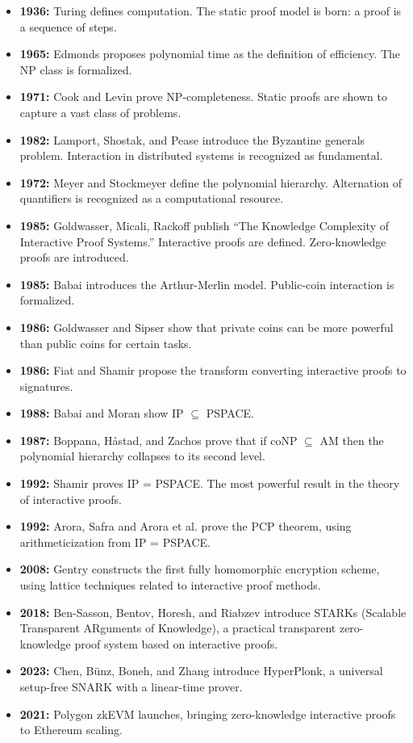 \begin{itemize}
\item \textbf{1936:} Turing defines computation. The static proof model is born: a proof is a sequence of steps.
\item \textbf{1965:} Edmonds proposes polynomial time as the definition of efficiency. The NP class is formalized.
\item \textbf{1971:} Cook and Levin prove NP-completeness. Static proofs are shown to capture a vast class of problems.
\item \textbf{1982:} Lamport, Shostak, and Pease introduce the Byzantine generals problem. Interaction in distributed systems is recognized as fundamental.
\item \textbf{1972:} Meyer and Stockmeyer define the polynomial hierarchy. Alternation of quantifiers is recognized as a computational resource.
\item \textbf{1985:} Goldwasser, Micali, Rackoff publish ``The Knowledge Complexity of Interactive Proof Systems.'' Interactive proofs are defined. Zero-knowledge proofs are introduced.
\item \textbf{1985:} Babai introduces the Arthur-Merlin model. Public-coin interaction is formalized.
\item \textbf{1986:} Goldwasser and Sipser show that private coins can be more powerful than public coins for certain tasks.
\item \textbf{1986:} Fiat and Shamir propose the transform converting interactive proofs to signatures.
\item \textbf{1988:} Babai and Moran show IP $\subseteq$ PSPACE.
\item \textbf{1987:} Boppana, H{\aa}stad, and Zachos prove that if coNP $\subseteq$ AM then the polynomial hierarchy collapses to its second level.
\item \textbf{1992:} Shamir proves IP = PSPACE. The most powerful result in the theory of interactive proofs.
\item \textbf{1992:} Arora, Safra and Arora et al. prove the PCP theorem, using arithmeticization from IP = PSPACE.
\item \textbf{2008:} Gentry constructs the first fully homomorphic encryption scheme, using lattice techniques related to interactive proof methods.
\item \textbf{2018:} Ben-Sasson, Bentov, Horesh, and Riabzev introduce STARKs (Scalable Transparent ARguments of Knowledge), a practical transparent zero-knowledge proof system based on interactive proofs.
\item \textbf{2023:} Chen, B{\"u}nz, Boneh, and Zhang introduce HyperPlonk, a universal setup-free SNARK with a linear-time prover.
\item \textbf{2021:} Polygon zkEVM launches, bringing zero-knowledge interactive proofs to Ethereum scaling.
\end{itemize}


